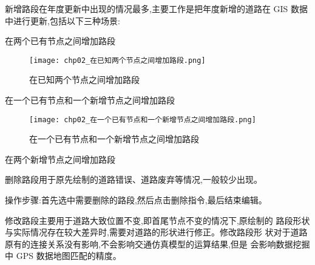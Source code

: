 新增路段在年度更新中出现的情况最多,主要工作是把年度新增的道路在
GIS 数据中进行更新,包括以下三种场景:

\begin{nbeae}
\item 在两个已有节点之间增加路段\\



\begin{figure}[ht]
  \centering
  \texttt{[image: chp02\_在已知两个节点之间增加路段.png]}
  \caption{在已知两个节点之间增加路段\label{fig:在已知两个节点之间增加路段} }
\end{figure}

\item 在一个已有节点和一个新增节点之间增加路段\\


\begin{figure}[ht]
  \centering
  \texttt{[image: chp02\_在一个已有节点和一个新增节点之间增加路段.png]}
  \caption{在一个已有节点和一个新增节点之间增加路段\label{fig:在一个已有节点和一个新增节点之间增加路段} }
\end{figure}

\item 在两个新增节点之间增加路段\\
\end{nbeae}

删除路段用于原先绘制的道路错误、道路废弃等情况,一般较少出现。

操作步骤:首先选中需要删除的路段,然后点击删除指令,最后结束编辑。

修改路段主要用于道路大致位置不变,即首尾节点不变的情况下,原绘制的
路段形状与实际情况存在较大差异时,需要对道路的形状进行修正。修改路段形
状对于道路原有的连接关系没有影响,不会影响交通仿真模型的运算结果,但是
会影响数据挖掘中 GPS 数据地图匹配的精度。

